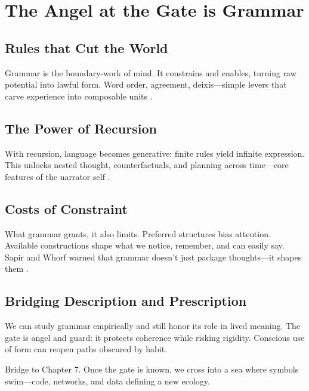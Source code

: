 \chapter{The Angel at the Gate is Grammar}

\section{Rules that Cut the World}

Grammar is the boundary-work of mind. It constrains and enables, turning raw potential into lawful form. Word order, agreement, deixis—simple levers that carve experience into composable units \parencite{tomasello2008origins}.

\section{The Power of Recursion}

With recursion, language becomes generative: finite rules yield infinite expression. This unlocks nested thought, counterfactuals, and planning across time—core features of the narrator self \parencite{deacon1997symbolic}.

\section{Costs of Constraint}

What grammar grants, it also limits. Preferred structures bias attention. Available constructions shape what we notice, remember, and can easily say. Sapir and Whorf warned that grammar doesn’t just package thoughts—it shapes them \parencite{sapir1929status,whorf1956language}.

\section{Bridging Description and Prescription}

We can study grammar empirically and still honor its role in lived meaning. The gate is angel and guard: it protects coherence while risking rigidity. Conscious use of form can reopen paths obscured by habit.

\bigskip
\noindent Bridge to Chapter 7. Once the gate is known, we cross into a sea where symbols swim—code, networks, and data defining a new ecology.
